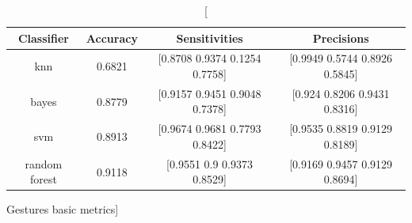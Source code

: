 \documentclass{classrep}
\begin{document}
{{{                \begin{table}[!htbp]
                    \centering
                    \begin{tabular}{|c|c|c|c|}
                        \hline
                        Classifier & Accuracy & Sensitivities & Precisions \\ \hline
                        knn & 0.6821 & [0.8708 0.9374 0.1254 0.7758] & [0.9949 0.5744 0.8926 0.5845] \\ \hline
                        bayes & 0.8779 & [0.9157 0.9451 0.9048 0.7378] & [0.924  0.8206 0.9431 0.8316] \\ \hline
                        svm & 0.8913 & [0.9674 0.9681 0.7793 0.8422] & [0.9535 0.8819 0.9129 0.8189] \\ \hline
                        random forest & 0.9118 & [0.9551 0.9    0.9373 0.8529] & [0.9169 0.9457 0.9129 0.8694] \\ \hline
                    \end{tabular}
                    \caption
                    [Gestures basic metrics]{}
                    \label{Gestures_basic_metrics}
                \end{table}
                \FloatBarrier

}}}
\end{document}
